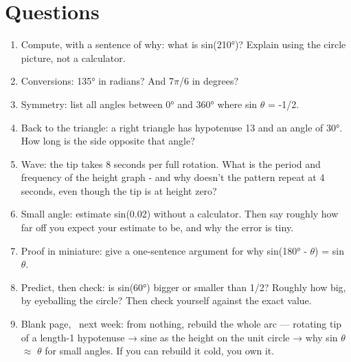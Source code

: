 \documentclass{article}
\begin{document}
\section{Questions} 
\begin{enumerate}
  \item Compute, with a sentence of why: what is sin(210°)? Explain using the circle picture, not a calculator.
  \item Conversions: 135° in radians? And 7$\pi$/6 in degrees?
  \item Symmetry: list all angles between 0° and 360° where sin $\theta$ = -1/2.
  \item Back to the triangle: a right triangle has hypotenuse 13 and an angle of 30°. How long is the side opposite that angle?
  \item Wave: the tip takes 8 seconds per full rotation. What is the period and frequency of the height graph - and why doesn't the pattern repeat at 4 seconds, even though the tip is at height zero?
  \item Small angle: estimate sin(0.02) without a calculator. Then say roughly how far off you expect your estimate to be, and why the error is tiny.
  \item Proof in miniature: give a one-sentence argument for why sin(180° - $\theta$) = sin $\theta$.
  \item Predict, then check: is sin(60°) bigger or smaller than 1/2? Roughly how big, by eyeballing the circle? Then check yourself against the exact value.
  \item Blank page, ~next week: from nothing, rebuild the whole arc — rotating tip of a length-1 hypotenuse → sine as the height on the unit circle → why sin $\theta$ $\approx$ $\theta$ for small angles. If you can rebuild it cold, you own it.
\end{enumerate}
\end{document}
